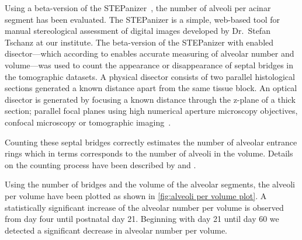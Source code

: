 Using a beta-version of the STEPanizer~\cite[available \href{http://stepanizer.com/}{online}]{Tschanz2010}, the number of alveoli per acinar segment has been evaluated. The STEP\-anizer is a simple, web-based tool for manual stereological assessment of digital images developed by Dr.\ Stefan Tschanz at our institute. The beta-version of the STEPanizer with enabled disector---which according to \citet{Hsia2010} enables accurate measuring of alveolar number and volume---was used to count the appearance or disappearance of septal bridges in the tomographic datasets. A physical disector consists of two parallel histological sections generated a known distance apart from the same tissue block. An optical disector is generated by focusing a known distance through the z-plane of a thick section; \eg parallel focal planes using high numerical aperture microscopy objectives, confocal microscopy or tomographic imaging~\cite{Hsia2010}.

Counting these septal bridges correctly estimates the number of alveolar entrance rings which in terms corresponds to the number of alveoli in the volume. Details on the counting process have been described by \citet{Hyde2004} and \citet{Ochs2004}.

Using the number of bridges and the volume of the alveolar segments, the alveoli per volume have been plotted as shown in \autoref{fig:alveoli per volume plot}. A statistically significant increase of the alveolar number per volume is observed from day four until postnatal day 21. Beginning with day 21 until day 60 we detected a significant decrease in alveolar number per volume.

